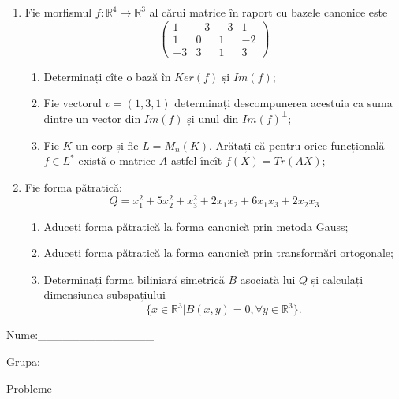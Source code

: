 \documentclass{article}
\begin{document}
\begin{enumerate}
 \item Fie morfismul $f:\mathbb{R}^4 \to \mathbb{R}^3$ al cărui matrice în raport cu bazele canonice este
$$\begin{pmatrix}
1&-3&-3&1\\
1&0&1&-2\\
-3&3&1&3
\end{pmatrix}$$

\begin{enumerate}
\item Determinați cîte o bază în $Ker(f)$ și $Im(f)$;
\item Fie vectorul $v=(1,3,1)$ determinați descompunerea acestuia ca suma dintre un vector din $Im(f)$ și unul din $Im(f)^\perp$;
\item Fie $K$ un corp și fie $L=M_n(K)$. Arătați că pentru orice funcțională $f \in L^*$ există o matrice $A$ astfel încît $f(X)=Tr(AX)$;
\end{enumerate}
\item Fie forma pătratică:
$$Q= x_1^2+5x_2^2+x_3^2+2x_1x_2+6x_1x_3+2x_2x_3$$

\begin{enumerate}
\item Aduceți forma pătratică la forma canonică prin metoda Gauss;
\item Aduceți forma pătratică la forma canonică prin transformări ortogonale;
\item Determinați forma biliniară simetrică $B$ asociată lui $Q$ și calculați dimensiunea subspațiului
$$\{x \in \mathbb{R}^3 | B(x,y)=0,\forall y \in \mathbb{R}^3\}.$$

\end{enumerate}
\end{enumerate}
\newpage
\begin{flushright}
Nume:\_\_\_\_\_\_\_\_\_\_\_\_\_\_
 
 
Grupa:\_\_\_\_\_\_\_\_\_\_\_\_\_\_
\end{flushright}
\begin{center}
\vspace{2cm}
{\Large Probleme}
\vspace{2cm}
\end{center}
\end{document}
